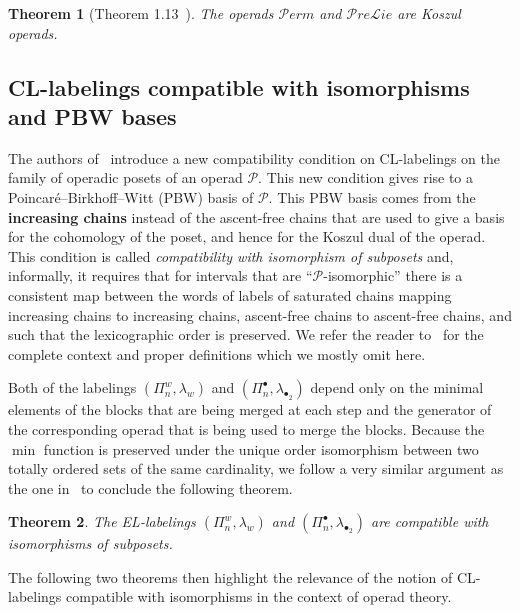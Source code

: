 \documentclass[11pt]{article}
\newtheorem{theo}{Theorem}[section]
\theoremstyle{definition}
\numberwithin{equation}{section}
\newcommand{\OP}{\mathcal{P}}
\newcommand{\Perm}{\mathcal{P}erm}
\newcommand{\Prelie}{\mathcal{P}re\mathcal{L}ie}
\begin{document}
\begin{theo}[Theorem 1.13~\cite{ChapotonVallete2006}]
    The operads $\Perm$ and $\Prelie$ are Koszul operads.   
\end{theo}

   \subsection{CL-labelings compatible with isomorphisms and PBW bases}


The authors of~\cite{BelliermillesDelcroixogerHoffbeck2021} introduce a new compatibility condition on CL-labelings on the family of operadic posets  of an operad $\OP$. This new condition gives rise to a Poincar\'e--Birkhoff--Witt (PBW) basis of $\OP$. This PBW basis comes from the {\bf increasing chains} instead of the ascent-free chains that are used to give a basis for the cohomology of the poset, and hence for the Koszul dual of the operad. This condition is called \emph{compatibility with isomorphism of subposets} and, informally, it requires that for intervals that are ``$\OP$-isomorphic'' there is a consistent map between the words of labels of saturated chains mapping increasing chains to increasing chains, ascent-free chains  to ascent-free chains, and such that the lexicographic  order is preserved.  We refer the reader to~\cite{BelliermillesDelcroixogerHoffbeck2021} for the complete context and proper definitions which we mostly omit here. 
  
    
 Both of the labelings $(\Pi_n^w,\lambda_w)$ and $(\Pi_n^{\bullet},\lambda_{\bullet_2})$ depend only on the minimal elements of the blocks that are being merged at each step and the generator of the corresponding operad that is being used to merge the blocks. Because the $\min$ function is preserved under the unique order isomorphism between two totally ordered sets of the same cardinality, we follow a very similar argument as the one in~\cite[Proposition 3.11]{BelliermillesDelcroixogerHoffbeck2021} to conclude the following theorem.
 \begin{theo}\label{theorem:pointed_weighted_isomorphism_subposets}
     The EL-labelings  $(\Pi_n^w,\lambda_w)$ and $(\Pi_n^{\bullet},\lambda_{\bullet_2})$ are compatible with isomorphisms of subposets.
 \end{theo}

 The following two theorems then highlight the relevance of the notion of CL-labelings compatible with isomorphisms in the context of operad theory.
\end{document}
